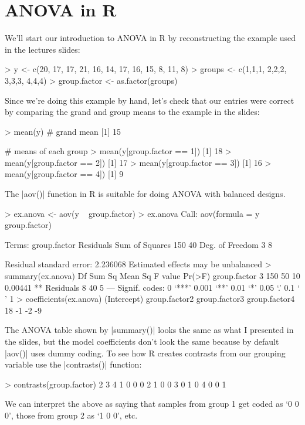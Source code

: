 
\section{ANOVA in R}

We'll start our introduction to ANOVA in R by reconstructing the example used in the lectures slides:

\begin{R}
> y <- c(20, 17, 17, 21, 16, 14, 17, 16, 15, 8, 11, 8)
> groups <- c(1,1,1, 2,2,2, 3,3,3, 4,4,4)
> group.factor <- as.factor(groups)
\end{R}
%
Since we're doing this example by hand, let's check that our entries were correct by comparing the grand and group means to the example in the slides:
%
\begin{R}
> mean(y)  # grand mean
[1] 15

# means of each group
> mean(y[group.factor == 1])
[1] 18
> mean(y[group.factor == 2])
[1] 17
> mean(y[group.factor == 3])
[1] 16
> mean(y[group.factor == 4])
[1] 9
\end{R}

The |aov()| function in R is suitable for doing ANOVA with balanced designs.
\begin{R}
> ex.anova <- aov(y ~ group.factor)
> ex.anova
Call:
   aov(formula = y ~ group.factor)

Terms:
                group.factor Residuals
Sum of Squares           150        40
Deg. of Freedom            3         8

Residual standard error: 2.236068
Estimated effects may be unbalanced
> summary(ex.anova)
             Df Sum Sq Mean Sq F value  Pr(>F)
group.factor  3    150      50      10 0.00441 **
Residuals     8     40       5
---
Signif. codes:  0 ‘***’ 0.001 ‘**’ 0.01 ‘*’ 0.05 ‘.’ 0.1 ‘ ’ 1
> coefficients(ex.anova)
  (Intercept) group.factor2 group.factor3 group.factor4
           18            -1            -2            -9
\end{R}

The ANOVA table shown by |summary()| looks the same as what I presented in the slides, but the model coefficients don't look the same because by default |aov()| uses dummy coding. To see how R creates contrasts from our grouping variable use the |contrasts()| function:
\begin{R}
> contrasts(group.factor)
  2 3 4
1 0 0 0
2 1 0 0
3 0 1 0
4 0 0 1
\end{R}
%
We can interpret the above as saying that samples from group 1 get coded as `0 0 0', those from group 2 as `1 0 0', etc.

